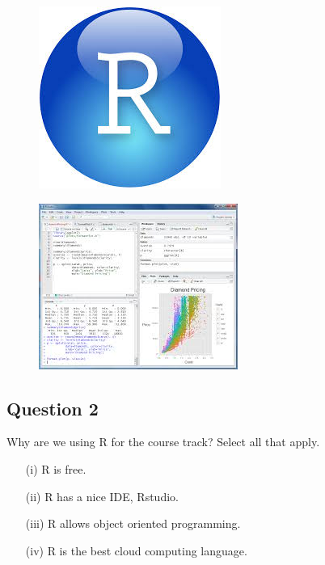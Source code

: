 \documentclass[12pt]{article}
\begin{document}
\begin{figure}
\centering
\includegraphics[width=0.7\linewidth]{rstudio}

\end{figure}
\begin{figure}
\centering
\includegraphics[width=0.7\linewidth]{rstudio2}

\end{figure}



\newpage
\subsection*{Question 2}

 
Why are we using R for the course track? Select all that apply. 


\begin{itemize}

\item[(i)] R is free. 

\item[(ii)] R has a nice IDE, Rstudio. 

\item[(iii)] R allows object oriented programming. 

\item[(iv)] R is the best cloud computing language. 

\end{itemize}
\newpage
\end{document}
